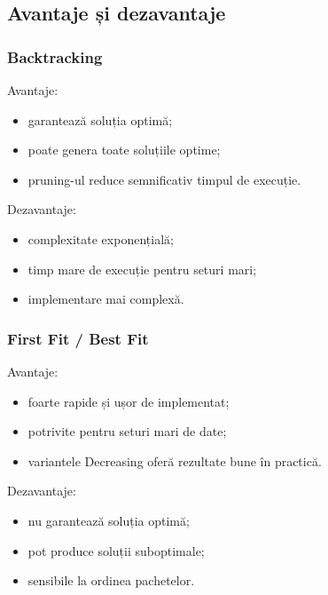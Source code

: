 \documentclass[runningheads]{llncs}
\begin{document}
	\subsection{Avantaje și dezavantaje}

	\subsubsection{Backtracking}

	Avantaje:
	\begin{itemize}
		\item garantează soluția optimă;
		\item poate genera toate soluțiile optime;
		\item pruning-ul reduce semnificativ timpul de execuție.
	\end{itemize}

	Dezavantaje:
	\begin{itemize}
		\item complexitate exponențială;
		\item timp mare de execuție pentru seturi mari;
		\item implementare mai complexă.
	\end{itemize}

	\subsubsection{First Fit / Best Fit}

	Avantaje:
	\begin{itemize}
		\item foarte rapide și ușor de implementat;
		\item potrivite pentru seturi mari de date;
		\item variantele Decreasing oferă rezultate bune în practică.
	\end{itemize}

	Dezavantaje:
	\begin{itemize}
		\item nu garantează soluția optimă;
		\item pot produce soluții suboptimale;
		\item sensibile la ordinea pachetelor.
	\end{itemize}

	\nocite{*} %
	\printbibliography
\end{document}
